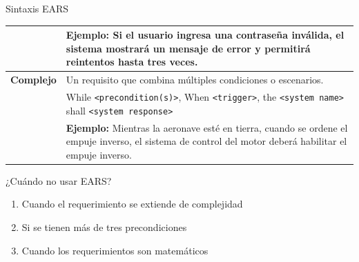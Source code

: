 \documentclass[
  24pt, %
  aspectratio=169, %
]{beamer}
\begin{document}
\begin{frame}{Sintaxis EARS}
{\begin{table}[h!]
\begin{tabular}{|>{\raggedright\arraybackslash}p{3cm}|>{\raggedright\arraybackslash}p{10cm}|}
        & \textbf{Ejemplo:} Si el usuario ingresa una contraseña inválida, el sistema mostrará un mensaje de error y permitirá reintentos hasta tres veces. \\
        \hline
        \textbf{Complejo} & 
        Un requisito que combina múltiples condiciones o escenarios. \\
        & While \texttt{<precondition(s)>}, When \texttt{<trigger>}, the \texttt{<system name>} shall \texttt{<system response>} \\
        & \textbf{Ejemplo:} Mientras la aeronave esté en tierra, cuando se ordene el empuje inverso, el sistema de control del motor deberá habilitar el empuje inverso. \\
        \hline
      \end{tabular}
    \end{table}
  }
\end{frame}


\begin{frame}{¿Cuándo no usar EARS?}
  \begin{enumerate}
  \item Cuando el requerimiento se extiende de complejidad
  \item Si se tienen más de tres precondiciones
  \item Cuando los requerimientos son matemáticos
  \end{enumerate}
\end{frame}
\end{document}
